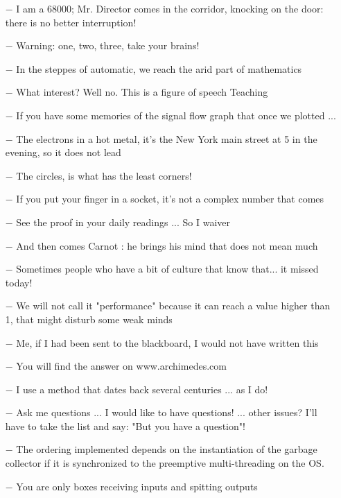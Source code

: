 \begin{itemize}
	\item[$-$] I am a 68000; Mr. Director comes in the corridor, knocking on the door: there is no better interruption! 
	\item[$-$] Warning: one, two, three, take your brains!
	\item[$-$] In the steppes of automatic, we reach the arid part of mathematics 
	\item[$-$] What interest? Well no. This is a figure of speech Teaching 
	\item[$-$] If you have some memories of the signal flow graph that once we plotted ...
	\item[$-$] The electrons in a hot metal, it's the New York main street at 5 in the evening, so it does not lead
	\item[$-$] The circles, is what has the least corners!
	\item[$-$] If you put your finger in a socket, it's not a complex number that comes
	\item[$-$] See the proof in your daily readings ... So I waiver
	\item[$-$] And then comes Carnot : he brings his mind that does not mean much 
	\item[$-$] Sometimes people who have a bit of culture that know that... it missed today! 
	\item[$-$] We will not call it "performance" because it can reach a value higher than 1, that might disturb some weak minds
	\item[$-$] Me, if I had been sent to the blackboard, I would not have written this 
	\item[$-$] You will find the answer on www.archimedes.com
	\item[$-$] I use a method that dates back several centuries ... as I do!
	\item[$-$] Ask me questions ... I would like to have questions! ... other issues? I'll have to take the list and say: "But you have a question"!
	\item[$-$] The ordering implemented depends on the instantiation of the garbage collector if it is synchronized to the preemptive multi-threading on the OS.
	\item[$-$] You are only boxes receiving inputs and spitting outputs
\end{itemize}

	\begin{center}\underline{\hspace{5 cm}}\end{center}
	
